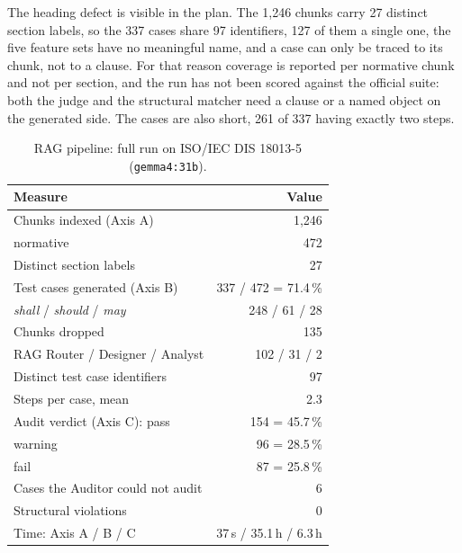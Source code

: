 The heading defect is visible in the plan. The 1,246 chunks carry 27 distinct
section labels, so the 337 cases share 97 identifiers, 127 of them a single
one, the five feature sets have no meaningful name, and a case can only be
traced to its chunk, not to a clause. For that reason coverage is reported
per normative chunk and not per section, and the run has not been scored
against the official suite: both the judge and the structural matcher need a
clause or a named object on the generated side. The cases are also short,
261 of 337 having exactly two steps.

\begin{table}[t]
  \centering
  \caption{RAG pipeline: full run on ISO/IEC DIS 18013-5
    (\texttt{gemma4:31b}).}
  \label{tab:agentic-run}
  \begin{tabular}{lr}
    \toprule
    Measure & Value \\
    \midrule
    Chunks indexed (Axis A)                 & 1,246 \\
    \quad normative                         & 472 \\
    Distinct section labels                 & 27 \\
    \midrule
    Test cases generated (Axis B)           & 337 / 472 = 71.4\,\% \\
    \quad \emph{shall} / \emph{should} / \emph{may} & 248 / 61 / 28 \\
    Chunks dropped                          & 135 \\
    \quad RAG Router / Designer / Analyst   & 102 / 31 / 2 \\
    Distinct test case identifiers          & 97 \\
    Steps per case, mean                    & 2.3 \\
    \midrule
    Audit verdict (Axis C): pass            & 154 = 45.7\,\% \\
    \quad warning                           & 96 = 28.5\,\% \\
    \quad fail                              & 87 = 25.8\,\% \\
    Cases the Auditor could not audit       & 6 \\
    Structural violations                   & 0 \\
    \midrule
    Time: Axis A / B / C                    & 37\,s / 35.1\,h / 6.3\,h \\
    \bottomrule
  \end{tabular}
\end{table}

